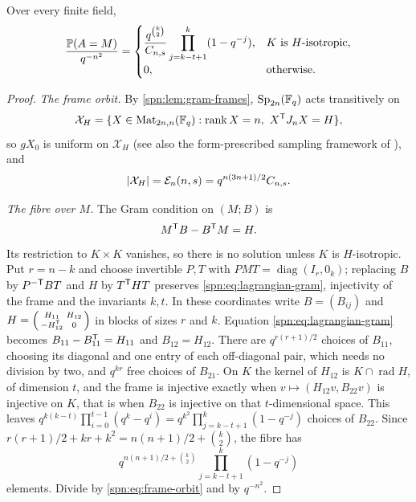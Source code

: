 \begin{corollary}\label{spn:thm:lagrangian}
Over every finite field,
\begin{equation}\label{spn:eq:lagrangian-density}
 \frac{\mathbb{P}(A=M)}{q^{-n^2}}=
 \begin{cases}
 \dfrac{q^{\binom k2}}{C_{n,s}}\displaystyle\prod_{j=k-t+1}^{k}(1-q^{-j}),
 &K\text{ is $H$-isotropic},\\[8pt]
 0,&\text{otherwise}.
 \end{cases}
\end{equation}
\end{corollary}

\begin{proof}
\emph{The frame orbit.} By \cref{spn:lem:gram-frames}, $\operatorname{Sp}_{2n}(\mathbb{F}_q)$ acts transitively on
\[
 \mathcal X_H=\{X\in\operatorname{Mat}_{2n,n}(\mathbb{F}_q):\operatorname{rank} X=n,\ X^{\mathsf{T}}J_nX=H\},
\]
so $gX_0$ is uniform on $\mathcal X_H$ (see also the form-prescribed sampling framework of
\cite{Ishizuka2026Uniform}), and
\begin{equation}\label{spn:eq:frame-orbit}
 \lvert\mathcal X_H\rvert=\mathcal{E}_n(n,s)=q^{n(3n+1)/2}C_{n,s}.
\end{equation}

\emph{The fibre over $M$.} The Gram condition on $(M;B)$ is
\begin{equation}\label{spn:eq:lagrangian-gram}
 M^{\mathsf{T}}B-B^{\mathsf{T}}M=H .
\end{equation}
Its restriction to $K\times K$ vanishes, so there is no solution unless $K$ is
$H$-isotropic. Put $r=n-k$ and choose invertible $P,T$ with
$PMT=\operatorname{diag}(I_r,0_k)$; replacing $B$ by $P^{-\mathsf{T}}BT$ and $H$ by $T^{\mathsf{T}}HT$
preserves \eqref{spn:eq:lagrangian-gram}, injectivity of the frame and the invariants $k,t$. In
these coordinates write $B=(B_{ij})$ and
$H=\left(\begin{smallmatrix}H_{11}&H_{12}\\-H_{12}^{\mathsf{T}}&0\end{smallmatrix}\right)$ in blocks
of sizes $r$ and $k$. Equation \eqref{spn:eq:lagrangian-gram} becomes
$B_{11}-B_{11}^{\mathsf{T}}=H_{11}$ and $B_{12}=H_{12}$. There are $q^{r(r+1)/2}$ choices of
$B_{11}$, choosing its diagonal and one entry of each off-diagonal pair, which needs no
division by two, and $q^{kr}$ free choices of $B_{21}$. On $K$ the kernel of $H_{12}$ is
$K\cap\operatorname{rad}H$, of dimension $t$, and the frame is injective exactly when
$v\mapsto(H_{12}v,B_{22}v)$ is injective on $K$, that is when $B_{22}$ is injective on that
$t$-dimensional space. This leaves $q^{k(k-t)}\prod_{i=0}^{t-1}(q^k-q^i)
=q^{k^2}\prod_{j=k-t+1}^k(1-q^{-j})$ choices of $B_{22}$. Since
$r(r+1)/2+kr+k^2=n(n+1)/2+\binom k2$, the fibre has
\[
 q^{n(n+1)/2+\binom k2}\prod_{j=k-t+1}^k(1-q^{-j})
\]
elements. Divide by \eqref{spn:eq:frame-orbit} and by $q^{-n^2}$.
\end{proof}

